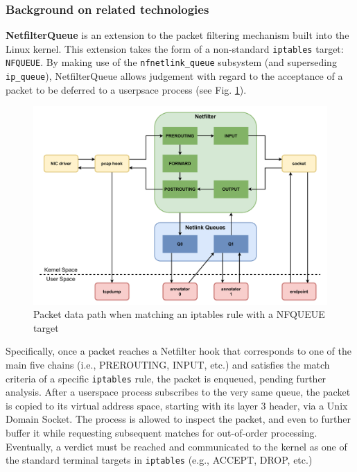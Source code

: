 \subsubsection{Background on related technologies}
\label{extend:ops:architecture:background}

\textbf{NetfilterQueue} is an extension to the packet filtering mechanism built into the Linux kernel. This extension takes the form of a non-standard \texttt{iptables} target: \texttt{NFQUEUE}. By making use of the \texttt{nfnetlink\_queue} subsystem (and superseding \texttt{ip\_queue}), NetfilterQueue allows judgement with regard to the acceptance of a packet to be deferred to a userpsace process (see Fig. \ref{extend:ops:fig:nfq}).

\begin{figure}[htb]
    \centering
    \includegraphics[width=\textwidth,keepaspectratio]{figures/netfilter_queue.pdf}
    \caption{Packet data path when matching an iptables rule with a NFQUEUE target}
    \label{extend:ops:fig:nfq}
\end{figure}

Specifically, once a packet reaches a Netfilter hook that corresponds to one of the main five chains (i.e., PREROUTING, INPUT, etc.) and satisfies the match criteria of a specific \texttt{iptables} rule, the packet is enqueued, pending further analysis. After a userspace process subscribes to the very same queue, the packet is copied to its virtual address space, starting with its layer 3 header, via a Unix Domain Socket. The process is allowed to inspect the packet, and even to further buffer it while requesting subsequent matches for out-of-order processing. Eventually, a verdict must be reached and communicated to the kernel as one of the standard terminal targets in \texttt{iptables} (e.g., ACCEPT, DROP, etc.)

